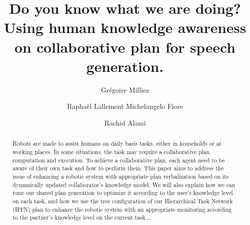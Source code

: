 \documentclass{llncs}
\begin{document}
\title{\LARGE \bf
Do you know what we are doing? Using human knowledge awareness on collaborative plan for speech generation.
}
%
%
\author{Gr\'egoire Milliez \and Rapha\"el Lallement
Michelangelo Fiore \and Rachid Alami}
%
%
%


\maketitle              %

\begin{abstract}
Robots are made to assist humans on daily basis tasks, either in households or at working places. In some situations, the task may require a collaborative plan computation and execution.
To achieve a collaborative plan, each agent need to be aware of their own task and how to perform them. This paper aims to address the issue of enhancing a robotic system with appropriate plan verbalization based on its dynamically updated collaborator's knowledge model.
 We will also explain how we can tune our shared plan generation to optimize it according to the user's knowledge level on each task, and how we use the tree configuration of our Hierarchical Task Network (HTN) plan to enhance the robotic system with an appropriate monitoring according to the partner's knowledge level on the current task.\dots
{}
\end{abstract}
%


\end{document}
